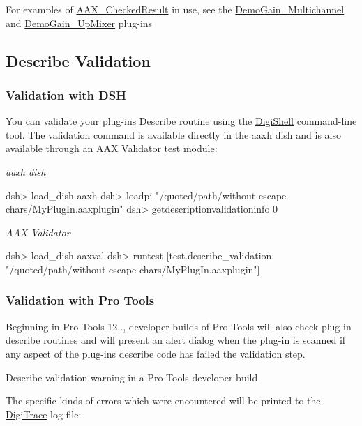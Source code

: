  For examples of \mbox{\hyperlink{a01601}{A\+A\+X\+\_\+\+Checked\+Result}} in use, see the \mbox{\hyperlink{a00848_DemoGain_Multichannel}{Demo\+Gain\+\_\+\+Multichannel}} and \mbox{\hyperlink{a00848_DemoGain_UpMixer}{Demo\+Gain\+\_\+\+Up\+Mixer}} plug-\/ins



 \hypertarget{a00796_describe_validation}{}\subsection{Describe Validation}\label{a00796_describe_validation}
\hypertarget{a00796_describe_validation_dsh}{}\subsubsection{Validation with D\+SH}\label{a00796_describe_validation_dsh}
 You can validate your plug-\/in\textquotesingle{}s Describe routine using the \mbox{\hyperlink{a00835}{Digi\+Shell}} command-\/line tool. The validation command is available directly in the aaxh dish and is also available through an A\+AX Validator test module\+:

 {\itshape aaxh dish} \begin{DoxyVerb}dsh> load_dish aaxh
dsh> loadpi "/quoted/path/without escape chars/MyPlugIn.aaxplugin"
dsh> getdescriptionvalidationinfo 0\end{DoxyVerb}


 {\itshape A\+AX Validator} \begin{DoxyVerb}dsh> load_dish aaxval
dsh> runtest [test.describe_validation, "/quoted/path/without escape chars/MyPlugIn.aaxplugin"]\end{DoxyVerb}


\hypertarget{a00796_describe_validation_protools}{}\subsubsection{Validation with Pro Tools}\label{a00796_describe_validation_protools}
 Beginning in Pro Tools 12.., developer builds of Pro Tools will also check plug-\/in describe routines and will present an alert dialog when the plug-\/in is scanned if any aspect of the plug-\/in\textquotesingle{}s describe code has failed the validation step.

   Describe validation warning in a Pro Tools developer build

 The specific kinds of errors which were encountered will be printed to the \mbox{\hyperlink{a00834}{Digi\+Trace}} log file\+:

